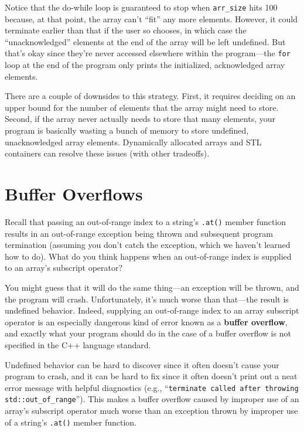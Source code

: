 \documentclass{article}
\begin{document}
Notice that the do-while loop is guaranteed to stop when \texttt{arr\_size} hits 100 because, at that point, the array can't ``fit'' any more elements. However, it could terminate earlier than that if the user so chooses, in which case the ``unacknowledged'' elements at the end of the array will be left undefined. But that's okay since they're never accessed elsewhere within the program---the \texttt{for} loop at the end of the program only prints the initialized, acknowledged array elements.

There are a couple of downsides to this strategy. First, it requires deciding on an upper bound for the number of elements that the array might need to store. Second, if the array never actually needs to store that many elements, your program is basically wasting a bunch of memory to store undefined, unacknowledged array elements. Dynamically allocated arrays and STL containers can resolve these issues (with other tradeoffs).

\section{Buffer Overflows}

Recall that passing an out-of-range index to a string's \texttt{.at()} member function results in an out-of-range exception being thrown and subsequent program termination (assuming you don't catch the exception, which we haven't learned how to do). What do you think happens when an out-of-range index is supplied to an array's subscript operator?

You might guess that it will do the same thing---an exception will be thrown, and the program will crash. Unfortunately, it's much worse than that---the result is undefined behavior. Indeed, supplying an out-of-range index to an array subscript operator is an especially dangerous kind of error known as a \textbf{buffer overflow}, and exactly what your program should do in the case of a buffer overflow is not specified in the C++ language standard.

Undefined behavior can be hard to discover since it often doesn't cause your program to crash, and it can be hard to fix since it often doesn't print out a neat error message with helpful diagnostics (e.g., ``\texttt{terminate called after throwing std::out\_of\_range}''). This makes a buffer overflow caused by improper use of an array's subscript operator much worse than an exception thrown by improper use of a string's \texttt{.at()} member function.
\end{document}
